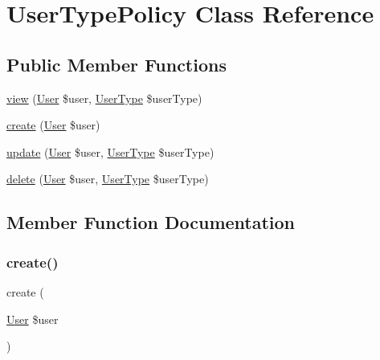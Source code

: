 \hypertarget{class_app_1_1_policies_1_1_user_type_policy}{}\section{User\+Type\+Policy Class Reference}
\label{class_app_1_1_policies_1_1_user_type_policy}
\subsection*{Public Member Functions}
\begin{DoxyCompactItemize}
\item 
\mbox{\hyperlink{class_app_1_1_policies_1_1_user_type_policy_ac074b0ae030096a496d4cec03e39df3e}{view}} (\mbox{\hyperlink{class_app_1_1_user}{User}} \$user, \mbox{\hyperlink{class_app_1_1_user_type}{User\+Type}} \$user\+Type)
\item 
\mbox{\hyperlink{class_app_1_1_policies_1_1_user_type_policy_a7626db07d2ee9a50d2839c019dbf037d}{create}} (\mbox{\hyperlink{class_app_1_1_user}{User}} \$user)
\item 
\mbox{\hyperlink{class_app_1_1_policies_1_1_user_type_policy_a4b46e9df20f22081407304fcf18fcf87}{update}} (\mbox{\hyperlink{class_app_1_1_user}{User}} \$user, \mbox{\hyperlink{class_app_1_1_user_type}{User\+Type}} \$user\+Type)
\item 
\mbox{\hyperlink{class_app_1_1_policies_1_1_user_type_policy_a566b3c16624d3c21ea877e2497dc0f3f}{delete}} (\mbox{\hyperlink{class_app_1_1_user}{User}} \$user, \mbox{\hyperlink{class_app_1_1_user_type}{User\+Type}} \$user\+Type)
\end{DoxyCompactItemize}


\subsection{Member Function Documentation}
\mbox{\label{class_app_1_1_policies_1_1_user_type_policy_a7626db07d2ee9a50d2839c019dbf037d}} 
\subsubsection{\texorpdfstring{create()}{create()}}
{\footnotesize\ttfamily create (\begin{DoxyParamCaption}\item[{\mbox{\hyperlink{class_app_1_1_user}{User}}}]{\$user }\end{DoxyParamCaption})}

